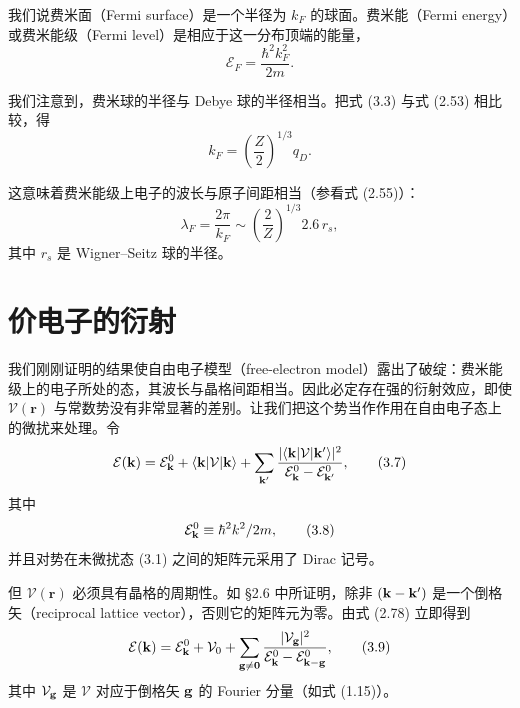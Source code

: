 
我们说费米面（Fermi surface）是一个半径为 $k_{F}$ 的球面。费米能（Fermi energy）或费米能级（Fermi level）是相应于这一分布顶端的能量，
\begin{equation*}
\mathcal{E}_{F}=\frac{\hbar^{2}k_{F}^{2}}{2m}.
\tag{3.4}
\end{equation*}

我们注意到，费米球的半径与 Debye 球的半径相当。把式 (3.3) 与式 (2.53) 相比较，得
\begin{equation*}
k_{F}=\left(\frac{Z}{2}\right)^{1/3}q_{D}.
\tag{3.5}
\end{equation*}

这意味着费米能级上电子的波长与原子间距相当（参看式 (2.55)）：
\begin{equation*}
\lambda_{F}=\frac{2\pi}{k_{F}}\sim\left(\frac{2}{Z}\right)^{1/3}2.6\,r_{s},
\tag{3.6}
\end{equation*}
其中 $r_{s}$ 是 Wigner--Seitz 球的半径。

\section{价电子的衍射}

我们刚刚证明的结果使自由电子模型（free-electron model）露出了破绽：费米能级上的电子所处的态，其波长与晶格间距相当。因此必定存在强的衍射效应，即使 $\mathcal{V}(\mathbf{r})$ 与常数势没有非常显著的差别。让我们把这个势当作作用在自由电子态上的微扰来处理。令
\begin{equation*}
\mathcal{E}({\bf k})=\mathcal{E}_{\bf k}^{0}+\langle{\bf k}|\mathcal{V}|{\bf k}\rangle+\sum_{{\bf k}'}\frac{|\langle{\bf k}|\mathcal{V}|{\bf k}'\rangle|^{2}}{\mathcal{E}_{\bf k}^{0}-\mathcal{E}_{{\bf k}'}^{0}},
\tag{3.7}
\end{equation*}
其中
\begin{equation*}
\mathcal{E}_{\bf k}^{0}\equiv\hbar^{2}k^{2}/2m,
\tag{3.8}
\end{equation*}
并且对势在未微扰态 (3.1) 之间的矩阵元采用了 Dirac 记号。

但 $\mathcal{V}(\mathbf{r})$ 必须具有晶格的周期性。如 §2.6 中所证明，除非 $({\bf k}-{\bf k}')$ 是一个倒格矢（reciprocal lattice vector），否则它的矩阵元为零。由式 (2.78) 立即得到
\begin{equation*}
\mathcal{E}({\bf k})=\mathcal{E}_{\bf k}^{0}+\mathcal{V}_{0}+\sum_{{\bf g}\neq{\bf 0}}\frac{|\mathcal{V}_{\bf g}|^{2}}{\mathcal{E}_{\bf k}^{0}-\mathcal{E}_{\bf k-{\bf g}}^{0}},
\tag{3.9}
\end{equation*}
其中 $\mathcal{V}_{\bf g}$ 是 $\mathcal{V}$ 对应于倒格矢 ${\bf g}$ 的 Fourier 分量（如式 (1.15)）。

